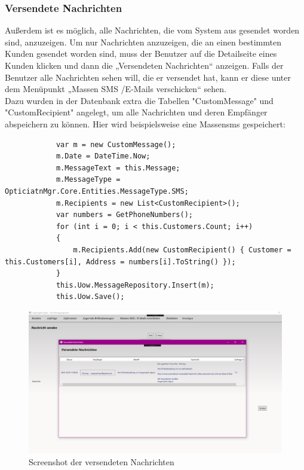 \subsubsection{Versendete Nachrichten}
Außerdem ist es möglich, alle Nachrichten, die vom System aus gesendet worden sind, anzuzeigen. Um nur Nachrichten anzuzeigen, die an einen bestimmten Kunden gesendet worden sind, muss der Benutzer auf die Detailseite eines Kunden klicken und dann die „Versendeten Nachrichten“ anzeigen. Falls der Benutzer alle Nachrichten sehen will, die er versendet hat, kann er diese unter dem Menüpunkt „Massen SMS /E-Mails verschicken“ sehen.\\
Dazu wurden in der Datenbank extra die Tabellen "CustomMessage" und "CustomRecipient" angelegt, um alle Nachrichten und deren Empfänger abspeichern zu können. Hier wird beispielsweise eine Massensms gespeichert:
\begin{lstlisting}
            var m = new CustomMessage();
            m.Date = DateTime.Now;
            m.MessageText = this.Message;
            m.MessageType = OpticiatnMgr.Core.Entities.MessageType.SMS;
            m.Recipients = new List<CustomRecipient>();
            var numbers = GetPhoneNumbers();
            for (int i = 0; i < this.Customers.Count; i++)
            {
                m.Recipients.Add(new CustomRecipient() { Customer = this.Customers[i], Address = numbers[i].ToString() });
            }
            this.Uow.MessageRepository.Insert(m);
            this.Uow.Save();
\end{lstlisting}
\begin{figure}[H]
\begin{center}
	\includegraphics[scale=.25]{images/VersendeteNachrichten.png}
\end{center}
	\caption{Screenshot der versendeten Nachrichten}
	\label{fig:sample}
\end{figure}



